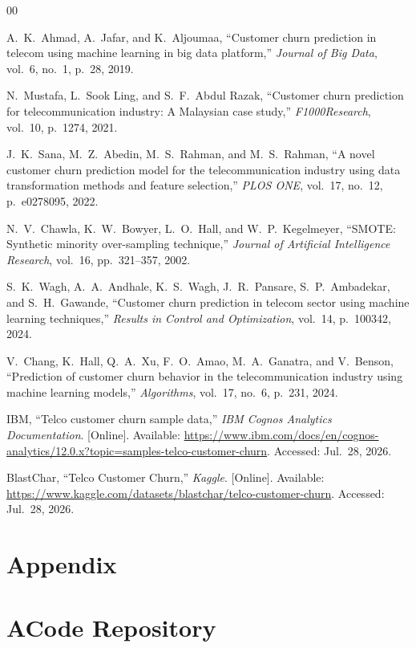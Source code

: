 \documentclass[conference]{IEEEtran}
\begin{document}
	\begin{thebibliography}{00}
		
		 A.~K.~Ahmad, A.~Jafar, and K.~Aljoumaa, ``Customer churn prediction in telecom using machine learning in big data platform,'' \textit{Journal of Big Data}, vol.~6, no.~1, p.~28, 2019.
		
		 N.~Mustafa, L.~Sook Ling, and S.~F.~Abdul Razak, ``Customer churn prediction for telecommunication industry: A Malaysian case study,'' \textit{F1000Research}, vol.~10, p.~1274, 2021.
		
		 J.~K.~Sana, M.~Z.~Abedin, M.~S.~Rahman, and M.~S.~Rahman, ``A novel customer churn prediction model for the telecommunication industry using data transformation methods and feature selection,'' \textit{PLOS ONE}, vol.~17, no.~12, p.~e0278095, 2022.
		
		 N.~V.~Chawla, K.~W.~Bowyer, L.~O.~Hall, and W.~P.~Kegelmeyer, ``SMOTE: Synthetic minority over-sampling technique,'' \textit{Journal of Artificial Intelligence Research}, vol.~16, pp.~321--357, 2002.

		 S.~K.~Wagh, A.~A.~Andhale, K.~S.~Wagh, J.~R.~Pansare, S.~P.~Ambadekar, and S.~H.~Gawande, ``Customer churn prediction in telecom sector using machine learning techniques,'' \textit{Results in Control and Optimization}, vol.~14, p.~100342, 2024.

		 V.~Chang, K.~Hall, Q.~A.~Xu, F.~O.~Amao, M.~A.~Ganatra, and V.~Benson, ``Prediction of customer churn behavior in the telecommunication industry using machine learning models,'' \textit{Algorithms}, vol.~17, no.~6, p.~231, 2024.

		 IBM, ``Telco customer churn sample data,'' \textit{IBM Cognos Analytics Documentation}. [Online]. Available: \url{https://www.ibm.com/docs/en/cognos-analytics/12.0.x?topic=samples-telco-customer-churn}. Accessed: Jul.~28, 2026.

		 BlastChar, ``Telco Customer Churn,'' \textit{Kaggle}. [Online]. Available: \url{https://www.kaggle.com/datasets/blastchar/telco-customer-churn}. Accessed: Jul.~28, 2026.
		
	\end{thebibliography}
	
	\newpage	
	\section*{Appendix}
	
	\section*{A\quad Code Repository}
	\label{app:code}
	
\end{document}
